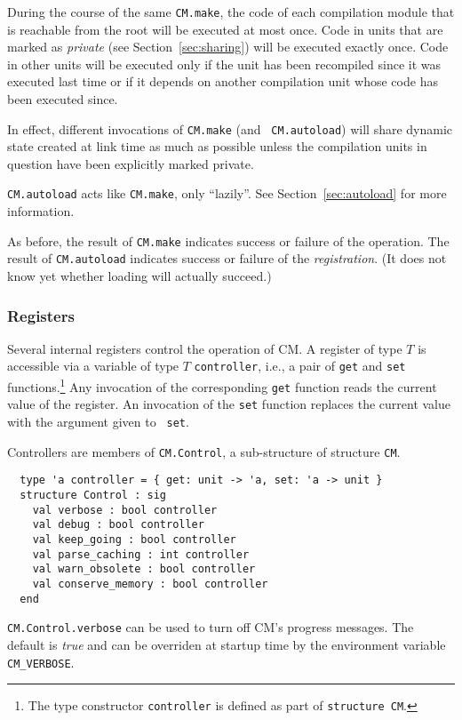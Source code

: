 \documentclass[titlepage,letterpaper]{article}
\begin{document}
During the course of the same {\tt CM.make}, the code of each
compilation module that is reachable from the root will be executed at
most once.  Code in units that are marked as {\it private} (see
Section~\ref{sec:sharing}) will be executed exactly once.  Code in
other units will be executed only if the unit has been recompiled
since it was executed last time or if it depends on another
compilation unit whose code has been executed since.

In effect, different invocations of {\tt CM.make} (and {\tt
CM.autoload}) will share dynamic state created at link time as much as
possible unless the compilation units in question have been explicitly
marked private.

{\tt CM.autoload} acts like {\tt CM.make}, only ``lazily''. See
Section~\ref{sec:autoload} for more information.

As before, the result of {\tt CM.make} indicates success or failure of
the operation.  The result of {\tt CM.autoload} indicates success or
failure of the {\em registration}.  (It does not know yet whether
loading will actually succeed.)

\subsubsection{Registers}

Several internal registers control the operation of CM.  A register of
type $T$ is accessible via a variable of type $T$ {\tt controller},
i.e., a pair of {\tt get} and {\tt set} functions.\footnote{The type
constructor {\tt controller} is defined as part of {\tt structure
CM}.}  Any invocation of the corresponding {\tt get} function reads
the current value of the register.  An invocation of the {\tt set}
function replaces the current value with the argument given to {\tt
set}.

Controllers are members of {\tt CM.Control}, a sub-structure of
structure {\tt CM}.

\begin{verbatim}
  type 'a controller = { get: unit -> 'a, set: 'a -> unit }
  structure Control : sig
    val verbose : bool controller
    val debug : bool controller
    val keep_going : bool controller
    val parse_caching : int controller
    val warn_obsolete : bool controller
    val conserve_memory : bool controller
  end
\end{verbatim}

{\tt CM.Control.verbose} can be used to turn off CM's progress
messages.  The default is {\em true} and can be overriden at startup
time by the environment variable {\tt CM\_VERBOSE}.
\end{document}
